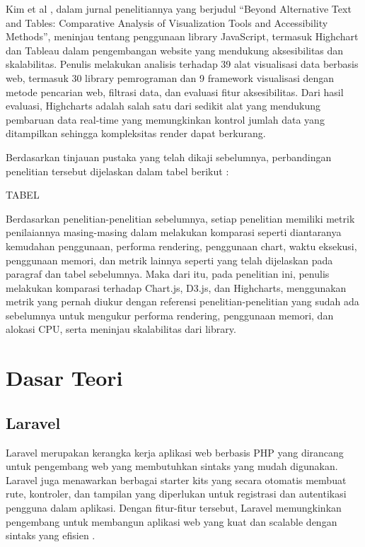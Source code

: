 Kim et al \cite{Kim2023}, dalam jurnal penelitiannya yang berjudul “Beyond Alternative Text and Tables: Comparative Analysis of Visualization Tools and Accessibility Methods”, meninjau tentang penggunaan library JavaScript, termasuk Highchart dan Tableau dalam pengembangan website yang mendukung aksesibilitas dan skalabilitas. Penulis melakukan analisis terhadap 39 alat visualisasi data berbasis web, termasuk 30 library pemrograman dan 9 framework visualisasi dengan metode pencarian web, filtrasi data, dan evaluasi fitur aksesibilitas. Dari hasil evaluasi, Highcharts adalah salah satu dari sedikit alat yang mendukung pembaruan data real-time yang memungkinkan kontrol jumlah data yang ditampilkan sehingga kompleksitas render dapat berkurang. 

Berdasarkan tinjauan pustaka yang telah dikaji sebelumnya, perbandingan penelitian tersebut dijelaskan dalam tabel berikut :

TABEL 	

Berdasarkan penelitian-penelitian sebelumnya, setiap penelitian memiliki metrik penilaiannya masing-masing dalam melakukan komparasi seperti diantaranya kemudahan penggunaan, performa rendering, penggunaan chart, waktu eksekusi, penggunaan memori, dan metrik lainnya seperti yang telah dijelaskan pada paragraf dan tabel sebelumnya. 
Maka dari itu, pada penelitian ini, penulis melakukan komparasi terhadap Chart.js, D3.js, dan Highcharts, menggunakan metrik yang pernah diukur dengan referensi penelitian-penelitian yang sudah ada sebelumnya untuk mengukur performa rendering, penggunaan memori, dan alokasi CPU, serta meninjau skalabilitas dari library.  

\section{Dasar Teori}

\subsection{Laravel}
Laravel merupakan kerangka kerja aplikasi web berbasis PHP yang dirancang untuk pengembang web yang membutuhkan sintaks yang mudah digunakan. Laravel juga menawarkan berbagai starter kits yang secara otomatis membuat rute, kontroler, dan tampilan yang diperlukan untuk registrasi dan autentikasi pengguna dalam aplikasi. Dengan fitur-fitur tersebut, Laravel memungkinkan pengembang untuk membangun aplikasi web yang kuat dan scalable dengan sintaks yang efisien \cite{Laravel}.

